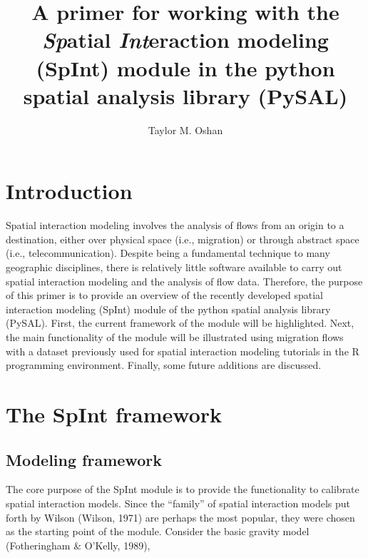 \documentclass[11pt]{article}
\begin{document}
    
    \title{\texorpdfstring{A primer for working with the
\textbf{\emph{Sp}}atial \textbf{\emph{Int}}eraction modeling (SpInt)
module in the python spatial analysis library
(PySAL)}{A primer for working with the Spatial Interaction modeling (SpInt) module in the python spatial analysis library (PySAL)}}\label{a-primer-for-working-with-the-spatial-interaction-modeling-spint-module-in-the-python-spatial-analysis-library-pysal}

    \author{Taylor M. Oshan}
    
    \maketitle
    
   

    \section{Introduction}\label{introduction}

    Spatial interaction modeling involves the analysis of flows from an
origin to a destination, either over physical space (i.e., migration) or
through abstract space (i.e., telecommunication). Despite being a
fundamental technique to many geographic disciplines, there is relatively
little software available to carry out spatial interaction modeling and
the analysis of flow data. Therefore, the purpose of this primer is to
provide an overview of the recently developed spatial interaction
modeling (SpInt) module of the python spatial analysis library (PySAL).
First, the current framework of the module will be highlighted. Next,
the main functionality of the module will be illustrated using migration
flows with a dataset previously used for spatial interaction modeling
tutorials in the R programming environment. Finally, some future
additions are discussed.

    \section{The SpInt framework}\label{the-spint-framework}

    \subsection{Modeling framework}\label{modeling-framework}

    The core purpose of the SpInt module is to provide the functionality to
calibrate spatial interaction models. Since the ``family'' of spatial
interaction models put forth by Wilson (Wilson, 1971) are perhaps the
most popular, they were chosen as the starting point of the module.
Consider the basic gravity model (Fotheringham \& O'Kelly, 1989),
\end{document}
